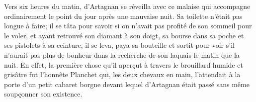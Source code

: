 Vers six heures du matin, d'Artagnan se réveilla avec ce malaise qui accompagne ordinairement le point du jour après une mauvaise nuit. Sa toilette n'était pas longue à faire; il se tâta pour savoir si on n'avait pas profité de son sommeil pour le voler, et ayant retrouvé son diamant à son doigt, sa bourse dans sa poche et ses pistolets à sa ceinture, il se leva, paya sa bouteille et sortit pour voir s'il n'aurait pas plus de bonheur dans la recherche de son laquais le matin que la nuit. En effet, la première chose qu'il aperçut à travers le brouillard humide et grisâtre fut l'honnête Planchet qui, les deux chevaux en main, l'attendait à la porte d'un petit cabaret borgne devant lequel d'Artagnan était passé sans même soupçonner son existence.